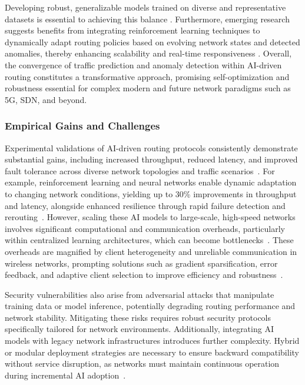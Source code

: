 \documentclass[sigconf]{acmart}
\begin{document}
Developing robust, generalizable models trained on diverse and representative datasets is essential to achieving this balance \cite{ref50}. Furthermore, emerging research suggests benefits from integrating reinforcement learning techniques to dynamically adapt routing policies based on evolving network states and detected anomalies, thereby enhancing scalability and real-time responsiveness \cite{ref53}. Overall, the convergence of traffic prediction and anomaly detection within AI-driven routing constitutes a transformative approach, promising self-optimization and robustness essential for complex modern and future network paradigms such as 5G, SDN, and beyond.

\subsubsection{Empirical Gains and Challenges}

Experimental validations of AI-driven routing protocols consistently demonstrate substantial gains, including increased throughput, reduced latency, and improved fault tolerance across diverse network topologies and traffic scenarios~\cite{ref4}. For example, reinforcement learning and neural networks enable dynamic adaptation to changing network conditions, yielding up to 30\% improvements in throughput and latency, alongside enhanced resilience through rapid failure detection and rerouting~\cite{ref53}. However, scaling these AI models to large-scale, high-speed networks involves significant computational and communication overheads, particularly within centralized learning architectures, which can become bottlenecks~\cite{ref53}. These overheads are magnified by client heterogeneity and unreliable communication in wireless networks, prompting solutions such as gradient sparsification, error feedback, and adaptive client selection to improve efficiency and robustness~\cite{ref4}.

Security vulnerabilities also arise from adversarial attacks that manipulate training data or model inference, potentially degrading routing performance and network stability. Mitigating these risks requires robust security protocols specifically tailored for network environments. Additionally, integrating AI models with legacy network infrastructures introduces further complexity. Hybrid or modular deployment strategies are necessary to ensure backward compatibility without service disruption, as networks must maintain continuous operation during incremental AI adoption~\cite{ref48}.
\end{document}
